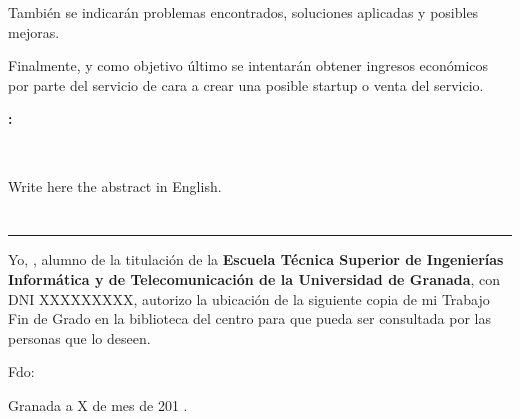 También se indicarán problemas encontrados, soluciones aplicadas y posibles mejoras.

Finalmente, y como objetivo último se intentarán obtener ingresos económicos por parte del servicio de cara a crear una posible startup o venta del servicio.

\cleardoublepage


\thispagestyle{empty}


\begin{center}
{\large\bfseries \myTitle: \mySubTitle}\\
\end{center}
\begin{center}
\myName\\
\end{center}

\bigskip

\vspace{0.7cm}
\bigskip

Write here the abstract in English.

\chapter*{}
\thispagestyle{empty}

\noindent\rule[-1ex]{\textwidth}{2pt}\bigskip\bigskip\bigskip

Yo, \textbf\myName, alumno de la titulación \myDegree de la \textbf{Escuela Técnica Superior
de Ingenierías Informática y de Telecomunicación de la Universidad de Granada}, con DNI XXXXXXXXX, autorizo la
ubicación de la siguiente copia de mi Trabajo Fin de Grado en la biblioteca del centro para que pueda ser
consultada por las personas que lo deseen.

\vspace{6cm}

\noindent Fdo: \myName

\vspace{2cm}

\begin{flushright}
Granada a X de mes de 201 .
\end{flushright}


\chapter*{}
\thispagestyle{empty}

